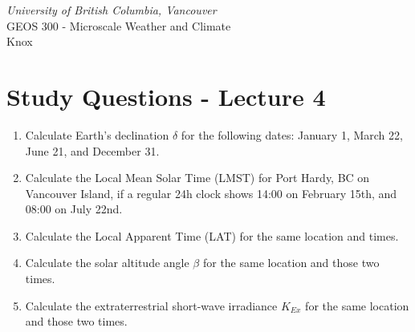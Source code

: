 \documentclass[11pt]{article}
\author{Andreas Christen}
\begin{document}
\begin{center}
\emph{University of British Columbia, Vancouver}\\
GEOS 300 - Microscale Weather and Climate\\
Knox
\section*{Study Questions - Lecture 4}
\end{center}

\begin{enumerate}

\item Calculate Earth's declination $\delta$ for the following dates: January 1, March 22, June 21, and December 31.

\item Calculate the {Local Mean Solar Time} (LMST) for Port Hardy, BC on Vancouver Island, if a regular 24h clock shows 14:00 on February 15th, and 08:00 on July 22nd. 

\item Calculate the {Local Apparent Time} (LAT) for the same location and times. 

\item Calculate the solar altitude angle $\beta$ for the same location and those two times. 

\item Calculate the extraterrestrial short-wave irradiance $K_{Ex}$ for the same location and those two times. 

\end{enumerate}

\noindent
\end{document}
